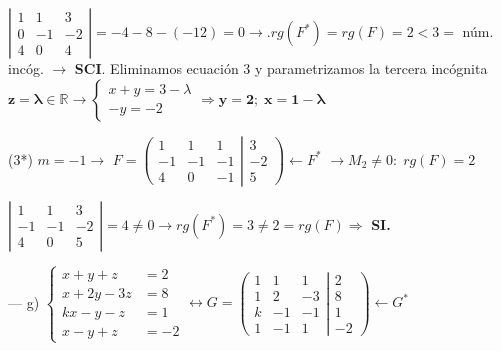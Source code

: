 \begin{proofw}
\noindent $\left| \begin{matrix} 1&1&3\\ 0&-1&-2 \\  4&0&4  \end{matrix} \right|= -4-8-(-12)=0 \longrightarrow. rg(F^*)=rg(F)=2<3=$ núm. incóg. $\to$ \textbf{SCI}. Eliminamos ecuación 3 y parametrizamos la tercera incógnita $\boldsymbol{z=\lambda} \in \mathbb R \to \begin{cases} x+y=3-\lambda \\ -y=-2 \end{cases} \Rightarrow \boldsymbol{y=2}; \; \boldsymbol{ x= 1-\lambda}$

\noindent (3*) $m=-1 \to  $ \small{$F=\left( \begin{matrix}   \boxed{1}&\boxed{1}&1\\-1&-1&-1\\\boxed{4}&\boxed{0}&-1     \end{matrix} \right|  \left.    \begin{matrix} 3\\-2\\5   \end{matrix} \right) \leftarrow F^*$} $ \to \boxed{M_2}\neq 0:\; rg(F)=2$

\noindent $\left| \begin{matrix} 1&1&3 \\ -1&-1&-2 \\ 4&0&5  \end{matrix} \right|=4\neq 0 \to rg(F^*)=3\neq 2 = rg(F) \Rightarrow $ \textbf{SI.}


\noindent --- g) $\begin{cases}  x+y+z&=2\\x+2y-3z&=8\\kx-y-z&=1\\x-y+z&=-2   \end{cases} \leftrightarrow G=\left( \begin{matrix}   1&1&1\\1&2&-3\\k&-1&-1\\1&-1&1     \end{matrix} \right|  \left.    \begin{matrix}    2\\8\\1\\-2\end{matrix} \right) \leftarrow G^*$


\end{proofw}
